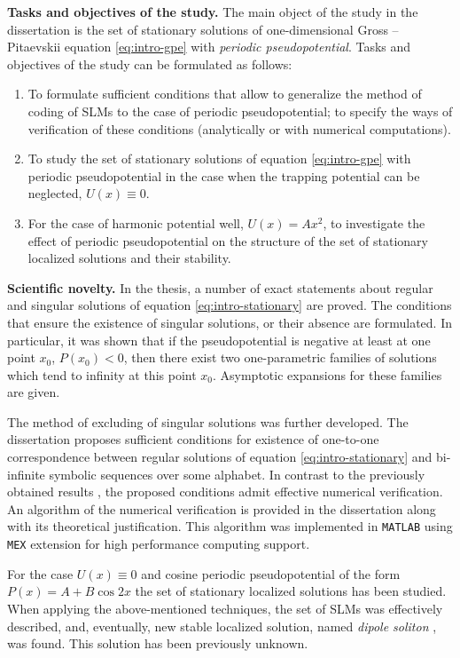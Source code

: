 \textbf{Tasks and objectives of the study.}
The main object of the study in the dissertation is the set of stationary solutions of one-dimensional Gross -- Pitaevskii equation \eqref{eq:intro-gpe} with {\it periodic pseudopotential}.
Tasks and objectives of the study can be formulated as follows:
\begin{enumerate}
	\item To formulate sufficient conditions that allow to generalize the method of coding of SLMs \cite{AlfimovAvramenko} to the case of periodic pseudopotential; to specify the ways of verification of these conditions (analytically or with numerical computations).
	\item To study the set of stationary solutions of equation \eqref{eq:intro-gpe} with periodic pseudopotential in the case when the trapping potential can be neglected, $U(x) \equiv 0$.
	\item For the case of harmonic potential well, $U(x) = A x^2$, to investigate the effect of periodic pseudopotential on the structure of the set of stationary localized solutions and their stability.
\end{enumerate}

\textbf{Scientific novelty.}
In the thesis, a number of exact statements about regular and singular solutions of equation \eqref{eq:intro-stationary} are proved.
The conditions that ensure the existence of singular solutions, or their absence are formulated.
In particular, it was shown that if the pseudopotential is negative at least at one point $x_0$, $P(x_0) < 0$, then there exist two one-parametric families of solutions which tend to infinity at this point $x_0$.
Asymptotic expansions for these families are given.

The method of excluding of singular solutions was further developed.
The dissertation proposes sufficient conditions for existence of one-to-one correspondence between regular solutions of equation \eqref{eq:intro-stationary} and bi-infinite symbolic sequences over some alphabet. 
In contrast to the previously obtained results \cite{AlfimovAvramenko}, the proposed conditions admit effective numerical verification.
An algorithm of the numerical verification is provided in the dissertation along with its theoretical justification.
This algorithm was implemented in {\tt MATLAB} using {\tt MEX} extension for high performance computing support.

For the case $U(x) \equiv 0$ and cosine periodic pseudopotential of the form $P(x) = A + B \cos 2x$ the set of stationary localized solutions has been studied.
When applying the above-mentioned techniques, the set of SLMs was effectively described, and, eventually, new stable localized solution, named {\it dipole soliton} \cite{LebedevAlfimovMalomed}, was found.
This solution has been previously unknown.

